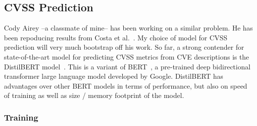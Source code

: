 \documentclass[12pt]{article}
\begin{document}



\subsection{CVSS Prediction} \label{cvss_prediction}

Cody Airey --a classmate of mine-- has been working on a similar problem. He has been repoducing
results from Costa et al.\@~\cite{costa}. My choice of model for CVSS prediction will very much
bootstrap off his work. So far, a strong contender for state-of-the-art model for predicting CVSS
metrics from CVE descriptions is the DistilBERT model~\cite{distilbert}. This is a variant of
BERT~\cite{BERT}, a pre-trained deep bidirectional transformer large language model developed by
Google. DistilBERT has advantages over other BERT models in terms of performance, but also on speed
of training as well as size / memory footprint of the model.

\subsubsection{Training}
\end{document}
